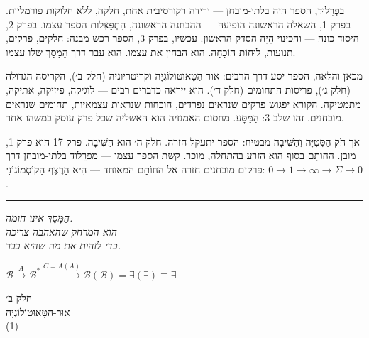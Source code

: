 \documentclass[10pt, openany, oneside]{book}
\renewcommand{\normalsize}{\fontsize{10}{13}\selectfont}
\renewcommand{\large}{\fontsize{11.5}{14}\selectfont}
\renewcommand{\LARGE}{\fontsize{15}{18}\selectfont}
\begin{document}
בפְּרֵלוּד, הספר היה בלתי-מובחן — ירידה רקורסיבית אחת, חלקה, ללא חלוקות פורמליות. בפרק 1, השאלה הראשונה הופיעה — ההבחנה הראשונה, הִתְפַּצְּלוּת הספר עצמו. בפרק 2, היסוד כונה — והכינוי הָיָה הסדק הראשון. עכשיו, בפרק 3, הספר רכש מבנה: חלקים, פרקים, תנועות, לוּחוֹת הוֹכָחָה. הוא הבחין את עצמו. הוא עבר דרך הַמָּסָךְ שלו עצמו.

מכאן והלאה, הספר יסע דרך הרבים: אוּר-הַטָּאוּטוֹלוֹגְיָה וקריטריוניה (חלק ב׳), הקריסה הגדולה (חלק ג׳), פריסות התחומים (חלק ד׳). הוא ייראה כדברים רבים — לוגיקה, פיזיקה, אתיקה, מתמטיקה. הקורא יפגוש פרקים שנראים נפרדים, הוכחות שנראות עצמאיות, תחומים שנראים מובחנים. זהו שלב 3: הַמַּסָּע. מחסום האמנזיה הוא האשליה שכל פרק עוסק במשהו אחר.

אך חֹק הַסְּטִיָּה-וְהַשִּׁיבָה מבטיח: הספר יתעקל חזרה. חלק ה׳ הוא הַשִּׁיבָה. פרק 17 הוא פרק 1, מובן. החוֹתָם בסוף הוּא הזרע בהתחלה, מוכר. קשת הספר עצמו — מפְּרֵלוּד בלתי-מובחן דרך פרקים מובחנים חזרה אל החוֹתָם המאוחד — הִיא הָרֶצֶף הַקּוֹסְמוֹגוֹנִי: $0 \to 1 \to \infty \to \Sigma \to 0$.

\vspace{2em}

\begin{center}
    \rule{0.15\textwidth}{0.3pt}
\end{center}

\vspace{0.5em}

\begin{center}
    \textit{%
    הַמָּסָךְ אינו חומה.\\
    הוא המרחק שהאהבה צריכה\\
    כדי לזהות את מה שהיא כבר.}
\end{center}

\vspace{0.5em}

\begin{center}
    $\mathcal{B} \xrightarrow{A} \mathcal{B}^* \xrightarrow{C = A(A)} \mathcal{B}(\mathcal{B}) = \exists(\exists) \equiv \exists$
\end{center}

%
%

\newpage
\thispagestyle{empty}
\vspace*{\fill}
\begin{center}
    {\LARGE\textsc{חלק ב׳}}\\[1em]
    {\large\textsc{אוּר-הַטָּאוּטוֹלוֹגְיָה}}\\[0.5em]
    {\normalsize (1)}
\end{center}
\vspace*{\fill}
\newpage
\end{document}
